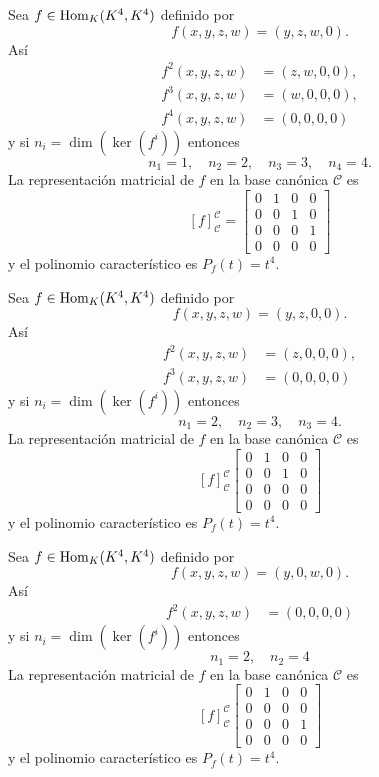 \begin{ejem}\label{ejnil1}
Sea $f\in\operatorname{Hom}_K(K^4,K^4)$ definido por
$$f(x,y,z,w)=(y,z,w,0).$$
As\'i
\begin{align*}
f^2(x,y,z,w) & = (z,w,0,0),\\
f^3(x,y,z,w) & = (w,0,0,0),\\
f^4(x,y,z,w) & = (0,0,0,0)
\end{align*}
y si $n_i=\dim(\ker(f^i))$ entonces
$$n_1=1,\quad n_2=2,\quad n_3=3,\quad n_4=4.$$
La representaci\'on matricial de $f$ en la base can\'onica $\mathcal{C}$ es
$$
\left[f\right]^{\mathcal{C}}_{\mathcal{C}}=\left[\begin{array}{rrrr}
0 & 1 & 0 & 0\\
0 & 0 & 1 & 0\\
0 & 0 & 0 & 1\\
0 & 0 & 0 & 0
\end{array}\right]
$$
y el polinomio caracter\'istico es $P_f(t)=t^4$.
\end{ejem}

\begin{ejem}\label{ejnil2}
Sea $f\in\operatorname{Hom}_K(K^4,K^4)$ definido por
$$f(x,y,z,w)=(y,z,0,0).$$
As\'i
\begin{align*}
f^2(x,y,z,w) & = (z,0,0,0),\\
f^3(x,y,z,w) & = (0,0,0,0)
\end{align*}
y si $n_i=\dim(\ker(f^i))$ entonces
$$n_1=2,\quad n_2=3,\quad n_3=4.$$
La representaci\'on matricial de $f$ en la base can\'onica $\mathcal{C}$ es
$$
\left[f\right]^{\mathcal{C}}_{\mathcal{C}}\left[\begin{array}{rrr|r}
0 & 1 & 0 & 0\\
0 & 0 & 1 & 0\\
0 & 0 & 0 & 0\\
\hline
0 & 0 & 0 & 0
\end{array}\right]
$$
y el polinomio caracter\'istico es $P_f(t)=t^4$.
\end{ejem}

\begin{ejem}\label{ejnil3}
Sea $f\in\operatorname{Hom}_K(K^4,K^4)$ definido por
$$f(x,y,z,w)=(y,0,w,0).$$
As\'i
\begin{align*}
f^2(x,y,z,w) & = (0,0,0,0)
\end{align*}
y si $n_i=\dim(\ker(f^i))$ entonces
$$n_1=2,\quad n_2=4$$
La representaci\'on matricial de $f$ en la base can\'onica $\mathcal{C}$ es
$$
\left[f\right]^{\mathcal{C}}_{\mathcal{C}}\left[\begin{array}{rr|rr}
0 & 1 & 0 & 0\\
0 & 0 & 0 & 0\\
\hline
0 & 0 & 0 & 1\\
0 & 0 & 0 & 0
\end{array}\right]
$$
y el polinomio caracter\'istico es $P_f(t)=t^4$.
\end{ejem}

